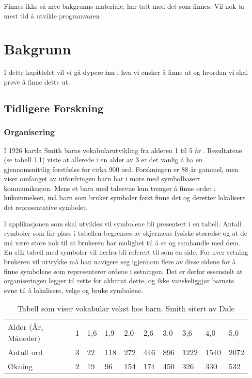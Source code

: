 Finnes ikke så mye bakgrunns materiale, har tatt med det som finnes. Vil nok ta mest tid å utvikle programvaren
 
\chapter{Bakgrunn}
I dette kapittelet vil vi gå dypere inn i hva vi ønsker å finne ut og hvordan vi skal prøve å finne dette ut. 


\section{Tidligere Forskning}

\subsection{Organisering}

I 1926 kartla Smith\cite{Smith} barns vokabularutvikling fra alderen 1 til 5 år . Resultatene (se tabell \ref{fig:BarnVak}) viste at allerede i en alder av 3 er det vanlig å ha en gjennomsnittlig forståelse for cirka 900 ord. Forskningen er 88 år gammel, men viser omfanget av utfordringen barn har i møte med symbolbasert kommunikasjon. Mens et barn med taleevne kun trenger å finne ordet i hukommelsen, må barn som bruker symboler først finne det og deretter lokalisere det representative symbolet. 

I applikasjonen som skal utvikles vil symbolene bli presentert i en tabell. Antall symboler som får plass i tabellen begrenses av skjermens fysiske størrelse og at de må være store nok til at brukeren har mulighet til å se  og samhandle med dem. En slik tabell med symboler vil herfra bli referert til som en side. For hver setning brukeren vil uttrykke må han navigere seg igjennom flere av disse sidene for å finne symbolene som representerer ordene i setningen. Det er derfor essensielt at organiseringen legger til rette for akkurat dette, og ikke vanskeliggjør barnets evne til å lokalisere, velge og bruke symbolene.

\begin{table}[h]
\begin{tabular}{llllllllll}
\hline
Alder (År, Måneder) & 1 & 1,6 & 1,9 & 2,0 & 2,6 & 3,0 & 3,6  & 4,0  & 5,0  \\ 
Antall ord          & 3 & 22  & 118 & 272 & 446 & 896 & 1222 & 1540 & 2072 \\ 
Økning              & 2 & 19  & 96  & 154 & 174 & 450 & 326  & 330  & 532  \\ \hline
\end{tabular}
\caption{Tabell som viser vokabular vekst hos barn.  Smith \cite{Smith} sitert av Dale \cite{Dale} }
\label{fig:BarnVak}
\end{table}


